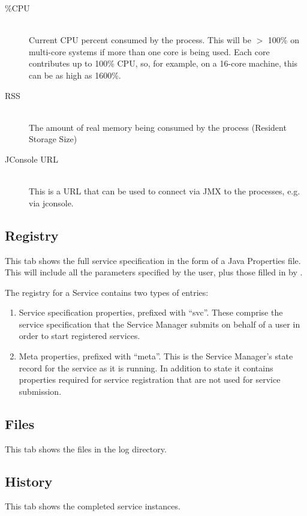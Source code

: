 \begin{description}
      \item[\%CPU] \hfill \\
        Current CPU percent consumed by the process.  This will be $>$ 100\% on 
        multi-core systems if more than one core is being used.  Each core contributes
        up to 100\% CPU, so, for example, on a 16-core machine, this can be as high
        as 1600\%.

      \item[RSS] \hfill \\
        The amount of real memory being consumed by the process (Resident Storage Size)

      \item[JConsole URL] \hfill \\
        This is a URL that can be used to connect via JMX to the processes, e.g. via
        jconsole.

   \end{description}

   \subsection{Registry}
   \label{sec:ws-managed-reservation-specification}
   This tab shows the full service specification in the form of a Java Properties
   file.  This will include all the parameters specified by the user, plus those
   filled in by {\DUCC}.
        
   The registry for a Service contains two types of entries:
   \begin{enumerate}
     \item Service specification properties, prefixed with ``svc''. These comprise
       the service specification that the Service Manager submits on behalf of
       a user in order to start registered services.
     \item Meta properties, prefixed with ``meta''.  This is the Service Manager's state
       record for the service as it is running.  In addition to state it contains
       properties required for service registration that are not used for
       service submission.
   \end{enumerate}
           
   \subsection{Files}
   This tab shows the files in the log directory.
   
           
   \subsection{History}
   This tab shows the completed service instances.
   
